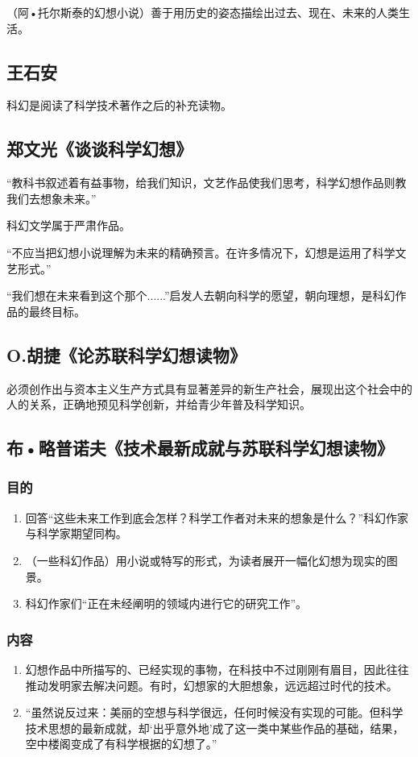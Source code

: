 \documentclass{ctexart}
\begin{document}
（阿•托尔斯泰的幻想小说）善于用历史的姿态描绘出过去、现在、未来的人类生活。

\subsection{王石安}

科幻是阅读了科学技术著作之后的补充读物。

\subsection{郑文光《谈谈科学幻想》}

“教科书叙述着有益事物，给我们知识，文艺作品使我们思考，科学幻想作品则教我们去想象未来。”

科幻文学属于严肃作品。

“不应当把幻想小说理解为未来的精确预言。在许多情况下，幻想是运用了科学文艺形式。”

“我们想在未来看到这个那个......”启发人去朝向科学的愿望，朝向理想，是科幻作品的最终目标。

\subsection{O.胡捷《论苏联科学幻想读物》}

必须创作出与资本主义生产方式具有显著差异的新生产社会，展现出这个社会中的人的关系，正确地预见科学创新，并给青少年普及科学知识。

\subsection{布•略普诺夫《技术最新成就与苏联科学幻想读物》}

\subsubsection{目的}
\begin{enumerate}
    \item 回答“这些未来工作到底会怎样？科学工作者对未来的想象是什么？”科幻作家与科学家期望同构。
    \item （一些科幻作品）用小说或特写的形式，为读者展开一幅化幻想为现实的图景。
    \item 科幻作家们“正在未经阐明的领域内进行它的研究工作”。
\end{enumerate}

\subsubsection{内容}
\begin{enumerate}
    \item 幻想作品中所描写的、已经实现的事物，在科技中不过刚刚有眉目，因此往往推动发明家去解决问题。有时，幻想家的大胆想象，远远超过时代的技术。
    \item “虽然说反过来：美丽的空想与科学很远，任何时候没有实现的可能。但科学技术思想的最新成就，却‘出乎意外地’成了这一类中某些作品的基础，结果，空中楼阁变成了有科学根据的幻想了。”
\end{enumerate}
\end{document}

